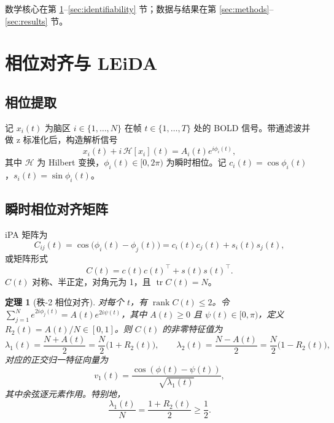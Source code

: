 \documentclass[11pt]{ctexart}
\newtheorem{theorem}{定理}
\theoremstyle{definition}
\newcommand{\rank}{\operatorname{rank}}
\newcommand{\tr}{\operatorname{tr}}
\begin{document}
数学核心在第 \ref{sec:leida}--\ref{sec:identifiability} 节；数据与结果在第 \ref{sec:methods}--\ref{sec:results} 节。

\section{相位对齐与 LEiDA}
\label{sec:leida}

\subsection{相位提取}
记 $x_i(t)$ 为脑区 $i\in\{1,\dots,N\}$ 在帧 $t\in\{1,\dots,T\}$ 处的 BOLD 信号。带通滤波并做 z 标准化后，构造解析信号
\begin{equation}
x_i(t)+i\,\mathcal{H}[x_i](t)=A_i(t)e^{i\phi_i(t)},
\end{equation}
其中 $\mathcal{H}$ 为 Hilbert 变换，$\phi_i(t)\in[0,2\pi)$ 为瞬时相位。记 $c_i(t)=\cos\phi_i(t)$，$s_i(t)=\sin\phi_i(t)$。

\subsection{瞬时相位对齐矩阵}
iPA 矩阵为
\begin{equation}
C_{ij}(t)=\cos\!\big(\phi_i(t)-\phi_j(t)\big)
=c_i(t)c_j(t)+s_i(t)s_j(t),
\end{equation}
或矩阵形式
\begin{equation}
C(t)=c(t)c(t)^{\top}+s(t)s(t)^{\top}.
\label{eq:Crank}
\end{equation}
$C(t)$ 对称、半正定，对角元为 1，且 $\tr C(t)=N$。

\begin{theorem}[秩-2 相位对齐]
\label{thm:rank2}
对每个 $t$，有 $\rank C(t)\le 2$。令
$\sum_{j=1}^N e^{2i\phi_j(t)}=A(t)e^{2i\psi(t)}$，其中 $A(t)\ge0$ 且
$\psi(t)\in[0,\pi)$，定义 $R_2(t)=A(t)/N\in[0,1]$。则 $C(t)$ 的非零特征值为
\begin{equation}
\lambda_1(t)=\frac{N+A(t)}{2}=\frac{N}{2}\big(1+R_2(t)\big),
\qquad
\lambda_2(t)=\frac{N-A(t)}{2}=\frac{N}{2}\big(1-R_2(t)\big),
\end{equation}
对应的正交归一特征向量为
\begin{equation}
v_1(t)=\frac{\cos(\phi(t)-\psi(t))}{\sqrt{\lambda_1(t)}},
\end{equation}
其中余弦逐元素作用。特别地，
\begin{equation}
\frac{\lambda_1(t)}{N}=\frac{1+R_2(t)}{2}\ge\frac12.
\label{eq:l1identity}
\end{equation}
\end{theorem}
\end{document}
